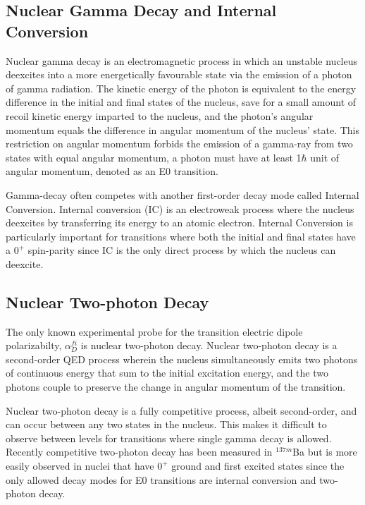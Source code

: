 \documentclass[cnatzke_thesis_proposal.tex]{subfiles}
\begin{document}
\subsection{Nuclear Gamma Decay and Internal Conversion}
Nuclear gamma decay is an electromagnetic process in which an unstable nucleus deexcites into a more energetically favourable state via the emission of a photon of gamma radiation. The kinetic energy of the photon is equivalent to the energy difference in the initial and final states of the nucleus, save for a small amount of recoil kinetic energy imparted to the nucleus, and the photon's angular momentum equals the difference in angular momentum of the nucleus' state. This restriction on angular momentum forbids the emission of a gamma-ray from two states with equal angular momentum, a photon must have at least 1$\hbar$ unit of angular momentum, denoted as an E0 transition.

Gamma-decay often competes with another first-order decay mode called Internal Conversion. Internal conversion (IC) is an electroweak process where the nucleus deexcites by transferring its energy to an atomic electron. Internal Conversion is particularly important for transitions where both the initial and final states have a $0^+$ spin-parity since IC is the only direct process by which the nucleus can deexcite. \cite{Krane1988} 

\subsection{Nuclear Two-photon Decay}

The only known experimental probe for the transition electric dipole polarizabilty, $\alpha_D^{fi}$ is nuclear two-photon decay.
Nuclear two-photon decay is a second-order QED process wherein the nucleus simultaneously emits two photons of continuous energy that sum to the initial excitation energy, and the two photons couple to preserve the change in angular momentum of the transition. \cite{Kramp1987} 

Nuclear two-photon decay is a fully competitive process, albeit second-order, and can occur between any two states in the nucleus. This makes it difficult to observe between levels  for transitions where single gamma decay is allowed. Recently competitive two-photon decay has been measured in $^{137m}$Ba \cite{soderstrom_electromagnetic_2020} but is more easily observed in nuclei that have $0^+$ ground and first excited states since the only allowed decay modes for E0 transitions are internal conversion and two-photon decay. 
\end{document}
